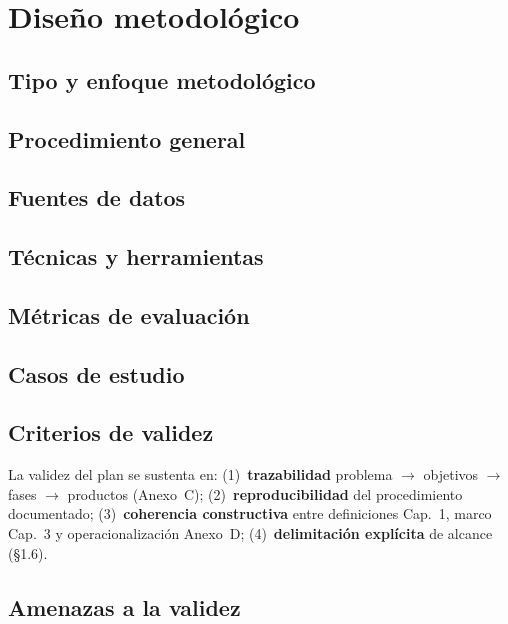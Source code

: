 \chapter{Diseño metodológico}
\label{cap:metodologia}

\section{Tipo y enfoque metodológico}


\section{Procedimiento general}


\section{Fuentes de datos}


\section{Técnicas y herramientas}


\section{Métricas de evaluación}


\section{Casos de estudio}


\section{Criterios de validez}

La validez del plan se sustenta en: (1)~\textbf{trazabilidad} problema $\rightarrow$ objetivos
$\rightarrow$ fases $\rightarrow$ productos (Anexo~C); (2)~\textbf{reproducibilidad} del
procedimiento documentado; (3)~\textbf{coherencia constructiva} entre definiciones Cap.~1, marco
Cap.~3 y operacionalización Anexo~D; (4)~\textbf{delimitación explícita} de alcance (§1.6).

\section{Amenazas a la validez}

